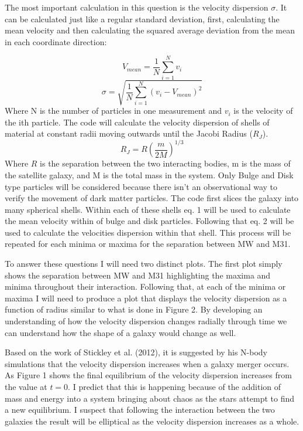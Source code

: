 \documentclass[fleqn,usenatbib]{mnras}
\begin{document}
The most important calculation in this question is the velocity dispersion $\sigma$. It can be calculated just like a regular standard deviation, first, calculating the mean velocity and then calculating the squared average deviation from the mean in each coordinate direction:

\begin{equation}
V_{mean} = \frac{1}{N}\sum_{i=1}^Nv_i
\end{equation}
\begin{equation}
\sigma = \sqrt{\frac{1}{N}\sum_{i=1}^N(v_i-V_{mean})^2}
\end{equation}
Where N is the number of particles in one measurement and $v_i$ is the velocity of the ith particle. 
The code will calculate the velocity dispersion of shells of material at constant radii moving outwards until the Jacobi Radius ($R_J$). \cite{1962AJ.....67..471K}
\begin{equation}
    R_J = R(\frac{m}{2M})^{1/3}
\end{equation}
Where $R$ is the separation between the two interacting bodies, m is the mass of the satellite galaxy, and M is the total mass in the system. Only Bulge and Disk type particles will be considered because there isn't an observational way to verify the movement of dark matter particles. The code first slices the galaxy into many spherical shells. Within each of these shells eq. 1 will be used to calculate the mean velocity within of bulge and disk particles. Following that eq. 2 will be used to calculate the velocities dispersion within that shell. This process will be repeated for each minima or maxima for the separation between MW and M31. 

To answer these questions I will need two distinct plots. The first plot simply shows the separation between MW and M31 highlighting the maxima and minima throughout their interaction. Following that, at each of the minima or maxima I will need to produce a plot that displays the velocity dispersion as a function of radius similar to what is done in Figure 2. \cite{refId0} By developing an understanding of how the velocity dispersion changes radially through time we can understand how the shape of a galaxy would change as well. 

Based on the work of Stickley et al. (2012), it is suggested by his N-body simulations that the velocity dispersion increases when a galaxy merger occurs. As Figure 1 shows the final equilibrium of the velocity dispersion increases from the value at $t=0$. I predict that this is happening because of the addition of mass and energy into a system bringing about chaos as the stars attempt to find a new equilibrium. I suspect that following the interaction between the two galaxies the result will be elliptical as the velocity dispersion increases as a whole.
\end{document}
